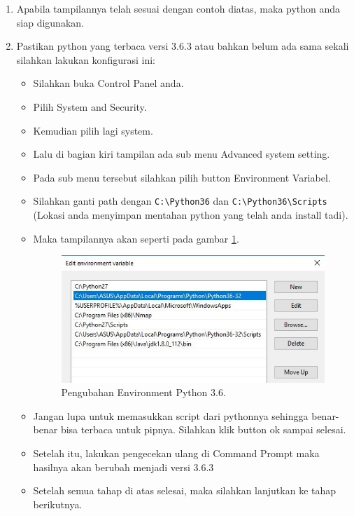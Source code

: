 \begin{enumerate}
\item Apabila tampilannya telah sesuai dengan contoh diatas, maka python anda siap digunakan.
\item Pastikan python yang terbaca versi 3.6.3 atau bahkan belum ada sama sekali silahkan lakukan konfigurasi ini:
\begin{itemize}
\item Silahkan buka Control Panel anda.
\item Pilih System and Security.
\item Kemudian pilih lagi system.
\item Lalu  di  bagian  kiri  tampilan  ada  sub menu  Advanced  system setting.
\item Pada  sub  menu  tersebut  silahkan  pilih  button  Environment Variabel.
\item Silahkan ganti path dengan \verb|C:\Python36| dan \verb|C:\Python36\Scripts| (Lokasi anda menyimpan mentahan python yang telah anda install tadi).
\item Maka tampilannya akan seperti pada gambar \ref{fig:editenv36}.
\begin{figure}[!htbp]
	\centerline{\includegraphics[width=1\textwidth]{figures/8/editenv36.jpg}}
	\caption{Pengubahan Environment Python 3.6.}
	\label{fig:editenv36}
\end{figure}

\item Jangan lupa untuk memasukkan script dari pythonnya sehingga benar-benar bisa terbaca untuk pipnya. Silahkan klik button ok sampai selesai.
\item Setelah itu, lakukan pengecekan ulang di Command Prompt maka hasilnya akan berubah menjadi versi 3.6.3
\item Setelah semua tahap di atas selesai, maka silahkan lanjutkan ke tahap berikutnya.
\end{itemize}
\end{enumerate}

